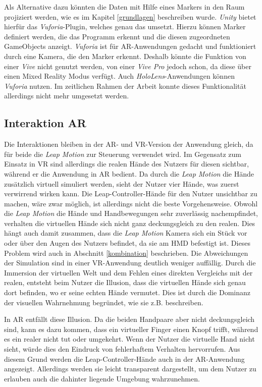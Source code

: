 Als Alternative dazu könnten die Daten mit Hilfe eines Markers in den Raum projiziert werden, wie es im Kapitel \ref{grundlagen} beschreiben wurde. \textit{Unity} bietet hierfür das \textit{Vuforia}-Plugin, welches genau das umsetzt. Hierzu können Marker definiert werden, die das Programm erkennt und die diesen zugeordneten GameObjects anzeigt. 
\textit{Vuforia} ist für AR-Anwendungen gedacht und funktioniert durch eine Kamera, die den Marker erkennt. Deshalb könnte die Funktion von einer \textit{Vive} nicht genutzt werden, von einer \textit{Vive Pro} jedoch schon, da diese über einen Mixed Reality Modus verfügt. Auch \textit{HoloLens}-Anwendungen können \textit{Vuforia} nutzen. 
Im zeitlichen Rahmen der Arbeit konnte dieses Funktionalität allerdings nicht mehr umgesetzt werden.

\subsection{Interaktion AR}

Die Interaktionen bleiben in der AR- und VR-Version der Anwendung gleich, da für beide die \textit{Leap Motion} zur Steuerung verwendet wird.
Im Gegensatz zum Einsatz in VR sind allerdings die realen Hände des Nutzers für diesen sichtbar, während er die Anwendung in AR bedient. Da durch die \textit{Leap Motion} die Hände zusätzlich virtuell simuliert werden, sieht der Nutzer vier Hände, was zuerst verwirrend wirken kann. 
Die Leap-Controller-Hände für den Nutzer unsichtbar zu machen, wäre zwar möglich, ist allerdings nicht die beste Vorgehensweise. Obwohl die \textit{Leap Motion} die Hände und Handbewegungen sehr zuverlässig nachempfindet, verhalten die virtuellen Hände sich nicht ganz deckungsgleich zu den realen. Dies hängt auch damit zusammen, dass die \textit{Leap Motion} Kamera sich ein Stück vor oder über den Augen des Nutzers befindet, da sie am HMD befestigt ist. Dieses Problem wird auch in Abschnitt \ref{kombination} beschrieben.
Die Abweichungen der Simulation sind in einer VR-Anwendung deutlich weniger auffällig. Durch die Immersion der virtuellen Welt und dem Fehlen eines direkten Vergleichs mit der realen, entsteht beim Nutzer die Illusion, dass die virtuellen Hände sich genau dort befinden, wo er seine echten Hände vermutet. Dies ist durch die Dominanz der visuellen Wahrnehmung begründet, wie sie z.B. \cite{Azmandian16} beschreiben.

In AR entfällt diese Illusion. Da die beiden Handpaare aber nicht deckungsgleich sind, kann es dazu kommen, dass ein virtueller Finger einen Knopf trifft, während es ein realer nicht tut oder umgekehrt. Wenn der Nutzer die virtuelle Hand nicht sieht, würde dies den Eindruck von fehlerhaftem Verhalten hervorrufen. 
Aus diesem Grund werden die Leap-Controller-Hände auch in der AR-Anwendung angezeigt. Allerdings werden sie leicht transparent dargestellt, um dem Nutzer zu erlauben auch die dahinter liegende Umgebung wahrzunehmen. 

